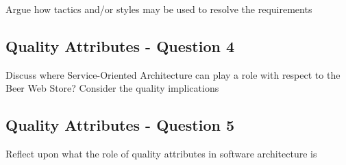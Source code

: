 \begin{question}
Argue how tactics and/or styles may be used to resolve the requirements
\end{question}


\subsection{Quality Attributes - Question 4}

\begin{question}
Discuss where Service-Oriented Architecture can play a role
with respect to the Beer Web Store? Consider the quality implications
\end{question}


\subsection{Quality Attributes - Question 5}

\begin{question}
Reflect upon what the role of quality attributes in software
architecture is
\end{question}


